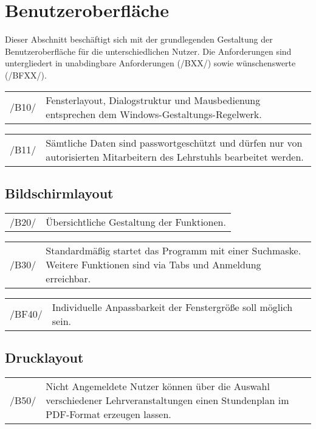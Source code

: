 \section{Benutzeroberfläche}
\label{sec:Benutzeroberfläche}


Dieser Abschnitt beschäftigt sich mit der grundlegenden Gestaltung der Benutzeroberfläche für die unterschiedlichen Nutzer. Die Anforderungen sind untergliedert in unabdingbare Anforderungen (/BXX/) sowie wünschenswerte (/BFXX/).


\begin{tabular}{p{1.5cm}p{14.5cm}}
 /B10/	& Fensterlayout, Dialogstruktur und Mausbedienung entsprechen dem Windows-Gestaltungs-Regelwerk. \\[0.25cm]	 
\end{tabular}

\begin{tabular}{p{1.5cm}p{14.5cm}}
 /B11/	& Sämtliche Daten sind passwortgeschützt und dürfen nur 
von autorisierten Mitarbeitern des Lehrstuhls bearbeitet werden. \\[0.25cm]	 
\end{tabular}


\subsection{Bildschirmlayout}

\begin{tabular}{p{1.5cm}p{14.5cm}}
 /B20/	& Übersichtliche Gestaltung der Funktionen. \\[0.25cm]	 
\end{tabular}

\begin{tabular}{p{1.5cm}p{14.5cm}}
 /B30/	& Standardmäßig startet das Programm mit einer Suchmaske. Weitere Funktionen sind via Tabs und Anmeldung erreichbar. \\[0.25cm]	 
\end{tabular}

\begin{tabular}{p{1.5cm}p{14.5cm}}
 /BF40/	& Individuelle Anpassbarkeit der Fenstergröße soll möglich sein. \\[0.25cm]	 
\end{tabular}

\subsection{Drucklayout}

\begin{tabular}{p{1.5cm}p{14.5cm}}
 /B50/	& Nicht Angemeldete Nutzer können über die Auswahl verschiedener Lehrveranstaltungen einen Stundenplan im PDF-Format erzeugen lassen. \\[0.25cm]	 
\end{tabular}

